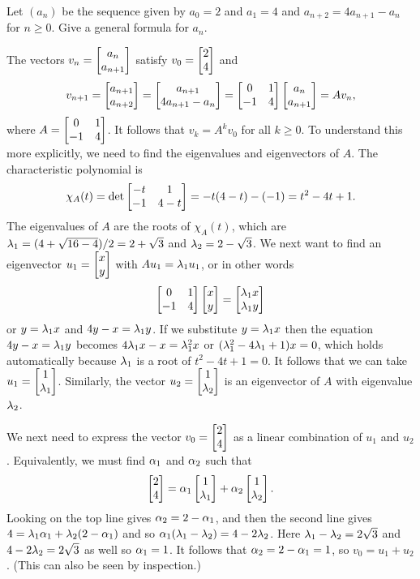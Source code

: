 \documentclass[a4paper]{amsart}
\renewenvironment{solution}{\SolutionInline}{\endSolutionInline}
\begin{document}
\begin{exercise}\label{ex-diffeq-iii}
 Let $(a_n)$ be the sequence given by $a_0=2$ and $a_1=4$ and
 $a_{n+2}=4a_{n+1}-a_n$ for $n\geq 0$.  Give a general formula for
 $a_n$. 
\end{exercise}
\begin{solution}
 The vectors $v_n=\left[\begin{matrix} a_n\\a_{n+1}\end{matrix}\right]$ satisfy $v_0=\left[\begin{matrix} 2\\4\end{matrix}\right]$
 and 
 \[ v_{n+1}
     = \left[\begin{matrix} a_{n+1}\\a_{n+2}\end{matrix}\right]
     = \left[\begin{matrix} a_{n+1}\\4a_{n+1}-a_n\end{matrix}\right] 
     = \left[\begin{matrix} 0&1 \\ -1&4\end{matrix}\right] \left[\begin{matrix} a_n\\ a_{n+1}\end{matrix}\right] 
     = A v_n,
 \]
 where $A=\left[\begin{matrix} 0&1\\ -1&4\end{matrix}\right]$.  It follows that $v_k=A^kv_0$ for all
 $k\geq 0$.  To understand this more explicitly, we need to find the
 eigenvalues and eigenvectors of $A$.  The characteristic polynomial
 is 
 \[ \chi_A(t) = \det\left[\begin{matrix} -t&1\\-1&4-t \end{matrix}\right] =
     -t(4-t)-(-1) = t^2-4t+1.
 \]
 The eigenvalues of $A$ are the roots of $\chi_A(t)$, which are
 $\lambda_1=(4+\sqrt{16-4})/2=2+\sqrt{3}$ and $\lambda_2=2-\sqrt{3}$.  We next
 want to find an eigenvector $u_1=\left[\begin{matrix} x\\ y\end{matrix}\right]$ with
 $Au_1=\lambda_1u_1$, or in other words
 \[ \left[\begin{matrix} 0 & 1 \\ -1 & 4 \end{matrix}\right] \left[\begin{matrix} x \\ y \end{matrix}\right] =
     \left[\begin{matrix} \lambda_1 x\\ \lambda_1 y\end{matrix}\right]
 \]
 or $y=\lambda_1x$ and $4y-x=\lambda_1y$.  If we substitute $y=\lambda_1x$ then
 the equation $4y-x=\lambda_1y$ becomes $4\lambda_1x-x=\lambda_1^2x$ or
 $(\lambda_1^2-4\lambda_1+1)x=0$, which holds automatically because $\lambda_1$ is
 a root of $t^2-4t+1=0$.  It follows that we can take
 $u_1=\left[\begin{matrix} 1\\\lambda_1\end{matrix}\right]$.  Similarly, the vector
 $u_2=\left[\begin{matrix} 1\\\lambda_2\end{matrix}\right]$ is an eigenvector of $A$ with eigenvalue
 $\lambda_2$.  

 We next need to express the vector $v_0=\left[\begin{matrix} 2\\4\end{matrix}\right]$ as a linear
 combination of $u_1$ and $u_2$.  Equivalently, we must find $\alpha_1$
 and $\alpha_2$ such that 
 \[ \left[\begin{matrix} 2\\ 4\end{matrix}\right] = \alpha_1 \left[\begin{matrix} 1\\\lambda_1\end{matrix}\right] + \alpha_2\left[\begin{matrix} 1\\\lambda_2\end{matrix}\right].
 \]
 Looking on the top line gives $\alpha_2=2-\alpha_1$, and then the second
 line gives $4=\lambda_1\alpha_1+\lambda_2(2-\alpha_1)$ and so
 $\alpha_1(\lambda_1-\lambda_2)=4-2\lambda_2$.  Here $\lambda_1-\lambda_2=2\sqrt{3}$ and
 $4-2\lambda_2=2\sqrt{3}$ as well so $\alpha_1=1$.  It follows that
 $\alpha_2=2-\alpha_1=1$, so $v_0=u_1+u_2$.  (This can also be seen by
 inspection.) 


\end{solution}
\end{document}

